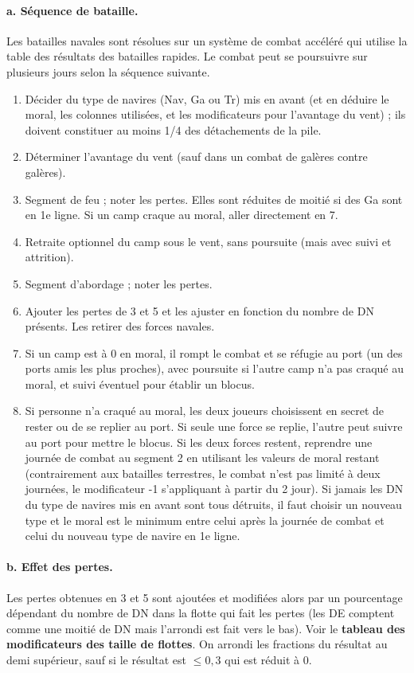 \paragraph{a. Séquence de bataille.}
Les batailles navales sont résolues sur un système de combat accéléré
qui utilise la table des résultats des batailles rapides. Le combat peut
se poursuivre sur plusieurs jours selon la séquence suivante.
\begin{enumerate}
\item Décider du type de navires (Nav, Ga ou Tr) mis en avant (et en déduire le moral,
les colonnes utilisées, et les modificateurs pour l'avantage du vent) ; ils
doivent constituer au moins 1/4 des détachements de la pile.
\item Déterminer l'avantage du vent (sauf dans un combat de galères
contre galères).
\item Segment de feu ; noter les pertes. Elles sont réduites de moitié
si des Ga sont en 1e ligne. Si un camp craque au moral,
aller directement en 7.
\item Retraite optionnel du camp sous le vent, sans poursuite (mais avec
suivi et attrition).
\item Segment d'abordage ; noter les pertes.
\item Ajouter les pertes de 3 et 5 et les ajuster en fonction du nombre de DN
présents. Les retirer des forces navales.
\item Si un camp est à 0 en moral, il rompt le combat et se réfugie au port
(un des ports amis les plus proches), avec poursuite si l'autre camp n'a
pas craqué au moral, et suivi éventuel pour établir un blocus.
\item Si personne n'a craqué au moral, les deux joueurs choisissent en secret
de rester ou de se replier au port. Si seule une force se replie, l'autre peut suivre
au port pour mettre le blocus. Si les deux forces restent, reprendre une journée
de combat au segment 2 en utilisant les valeurs de moral restant
(contrairement aux batailles terrestres, le combat n'est pas limité à deux
journées, le modificateur -1 s'appliquant à partir du 2 jour).
Si jamais les DN du type de navires mis en avant sont tous détruits, il
faut choisir un nouveau type et le moral est le minimum entre celui après la journée
de combat et celui du nouveau type de navire en 1e ligne.
\end{enumerate}

\paragraph{b. Effet des pertes.}
Les pertes obtenues en 3 et 5 sont ajoutées et modifiées alors
par un pourcentage dépendant du nombre de DN dans la flotte
qui fait les pertes (les DE comptent comme une moitié de DN mais
l'arrondi est fait vers le bas). Voir le \textbf{tableau des modificateurs des
taille de flottes}. On arrondi les fractions du résultat au demi supérieur,
sauf si le résultat est $\le 0,3$ qui est réduit à 0.

